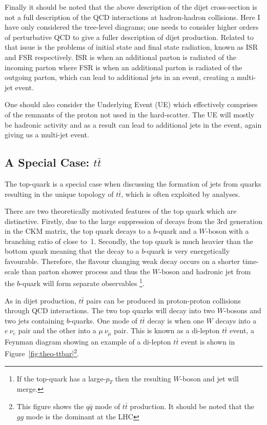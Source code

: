 Finally it should be noted that the above description of the dijet cross-section is
not a full description of the QCD interactions at hadron-hadron collisions.
Here I have only considered the tree-level diagrams;
one needs to consider higher orders of perturbative QCD to give a fuller description of dijet production.
Related to that issue is the problems of initial state and final state radiation, known as ISR and FSR respectively.
ISR is when an additional parton is radiated of the incoming parton where FSR is when an additional parton is radiated of the outgoing parton,
which can lead to additional jets in an event, creating a multi-jet event.

One should also consider the Underlying Event (UE) which effectively comprises of the remnants of the proton not used in the hard-scatter.
The UE will mostly be hadronic activity and as a result can lead to additional jets in the event, again giving us a multi-jet event.

\subsection{A Special Case: $t\bar{t}$}
\label{sec:theo-ttbar}

The top-quark is a special case when discussing the formation of jets from quarks
resulting in the unique topology of $t\bar{t}$, which is often exploited by analyses.

There are two theoretically motivated features of the top quark which are distinctive.
Firstly, due to the large suppression of decays from the 3rd generation in the CKM matrix,
the top quark decays to a $b$-quark and a $W$-boson with a branching ratio of close to~1.
Secondly, the top quark is much heavier than the bottom quark
meaning that the decay to a $b$-quark is very energetically favourable.
Therefore, the flavour changing weak decay occurs on a shorter time-scale than parton shower process
and thus the $W$-boson and hadronic jet from the $b$-quark will form separate observables
\footnote{If the top-quark has a large-$p_T$ then the resulting $W$-boson and jet will merge.}.

As in dijet production, $t\bar{t}$ pairs can be produced in proton-proton collisions through QCD interactions.
The two top quarks will decay into two $W$-bosons and two jets containing $b$-quarks.
One mode of $t\bar{t}$ decay is when one $W$ decays into a $e~\nu_e$ pair and the other into a $\mu~\nu_\mu$ pair.
This is known as a di-lepton $t\bar{t}$ event, a Feynman diagram showing an example of a di-lepton $t\bar{t}$ event is shown in
Figure~\ref{fig:theo-ttbar}\footnote{This figure shows the $q\bar{q}$ mode of $t\bar{t}$ production. It should be noted that the $gg$ mode is the dominant at the LHC}.

